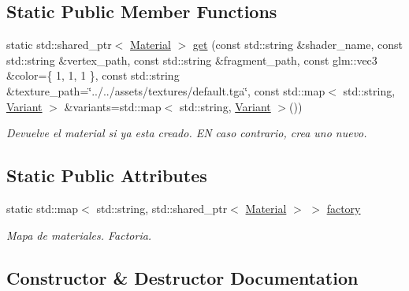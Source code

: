 \subsection*{Static Public Member Functions}
\begin{DoxyCompactItemize}
\item 
static std\+::shared\+\_\+ptr$<$ \mbox{\hyperlink{classexample_1_1_material}{Material}} $>$ \mbox{\hyperlink{classexample_1_1_material_aee25c52abc2c47f9fab55faa40b7403b}{get}} (const std\+::string \&shader\+\_\+name, const std\+::string \&vertex\+\_\+path, const std\+::string \&fragment\+\_\+path, const glm\+::vec3 \&color=\{ 1, 1, 1 \}, const std\+::string \&texture\+\_\+path=\char`\"{}../../assets/textures/default.\+tga\char`\"{}, const std\+::map$<$ std\+::string, \mbox{\hyperlink{structexample_1_1_variant}{Variant}} $>$ \&variants=std\+::map$<$ std\+::string, \mbox{\hyperlink{structexample_1_1_variant}{Variant}} $>$())
\begin{DoxyCompactList}\small\item\em Devuelve el material si ya esta creado. EN caso contrario, crea uno nuevo. \end{DoxyCompactList}\end{DoxyCompactItemize}
\subsection*{Static Public Attributes}
\begin{DoxyCompactItemize}
\item 
static std\+::map$<$ std\+::string, std\+::shared\+\_\+ptr$<$ \mbox{\hyperlink{classexample_1_1_material}{Material}} $>$ $>$ \mbox{\hyperlink{classexample_1_1_material_afc40351ededce03a8620f30c635a1b35}{factory}}
\begin{DoxyCompactList}\small\item\em Mapa de materiales. Factoria. \end{DoxyCompactList}\end{DoxyCompactItemize}


\subsection{Constructor \& Destructor Documentation}
\mbox{\label{classexample_1_1_material_ad3e99abb9dc569c6c3ed8491f214d681}} 
